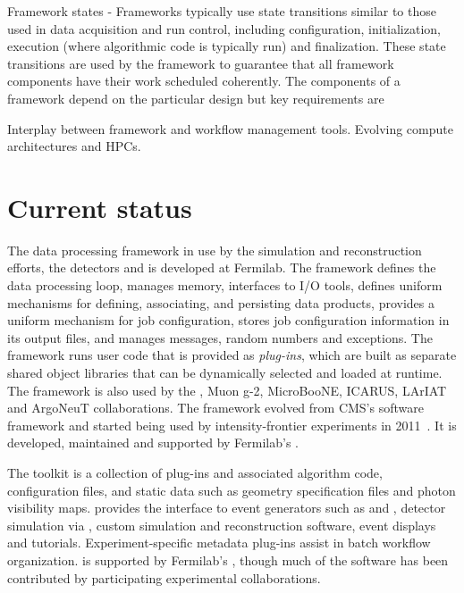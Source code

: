 \documentclass[../main-v1.tex]{subfiles}
\begin{document}
Framework states - Frameworks typically use state transitions similar to those used in data acquisition and run control, including configuration, initialization, execution (where algorithmic code is typically run) and finalization.  These state transitions are used by the framework to guarantee that all framework components have their work scheduled coherently.  The components of a framework depend on the particular design but key requirements are




Interplay between framework and workflow management tools.  Evolving compute architectures and HPCs.



\section{Current status }

The data processing framework in use by the  simulation and reconstruction efforts, the  detectors and  is  developed at Fermilab.  The  framework defines the data processing loop, manages memory, interfaces to I/O tools, defines uniform mechanisms for defining, associating, and persisting data products, provides a uniform mechanism for job configuration, stores job configuration information in its output files, and manages messages, random numbers and exceptions.  The  framework runs user code that is provided as {\it plug-ins}, which are built as separate shared object libraries that can be dynamically selected and loaded at runtime.  The  framework is also used by the , Muon g-2, MicroBooNE, ICARUS, LArIAT and ArgoNeuT collaborations.  The  framework evolved from CMS's software framework and started being used by intensity-frontier experiments in 2011~\cite{Green:2012gv}. It is developed, maintained and supported by Fermilab's .

The  toolkit is a collection of  plug-ins and associated algorithm code, configuration files, and static data such as geometry specification files and photon visibility maps.   provides the interface to event generators such as  and , detector simulation via , custom simulation and reconstruction software, event displays and tutorials.  Experiment-specific metadata plug-ins assist in batch workflow organization.   is supported by Fermilab's , though much of the software has been contributed by participating experimental collaborations.
\end{document}
